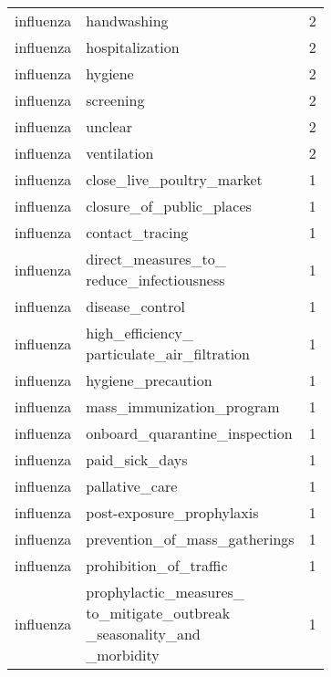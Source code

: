\documentclass[
]{article}
\begin{document}
\begin{longtable}{llr}
influenza & handwashing & 2\\
 
influenza & hospitalization & 2\\
 
influenza & hygiene & 2\\
 
influenza & screening & 2\\
 
influenza & unclear & 2\\
 
influenza & ventilation & 2\\
 
influenza & close\_live\_poultry\_market & 1\\
 
influenza & closure\_of\_public\_places & 1\\
 
influenza & contact\_tracing & 1\\
 
influenza & 
\makecell[l]{
	direct\_measures\_to\_\\
	reduce\_infectiousness
	} & 1\\
 
influenza & disease\_control & 1\\
 
influenza & 
\makecell[l]{
	high\_efficiency\_\\
	particulate\_air\_filtration
	} & 1\\
 
influenza & hygiene\_precaution & 1\\
 
influenza & mass\_immunization\_program & 1\\
 
influenza & onboard\_quarantine\_inspection & 1\\
 
influenza & paid\_sick\_days & 1\\
 
influenza & pallative\_care & 1\\
 
influenza & post-exposure\_prophylaxis & 1\\
 
influenza & prevention\_of\_mass\_gatherings & 1\\
 
influenza & prohibition\_of\_traffic & 1\\
 
influenza &
\makecell[l]{
	prophylactic\_measures\_\\
	to\_mitigate\_outbreak\\
	\_seasonality\_and\\
	\_morbidity
} & 1\\
 

\end{longtable}
\end{document}
